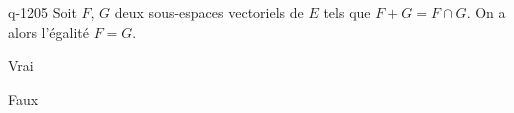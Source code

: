 \begin{truefalse}{q-1205}
Soit $F$, $G$ deux sous-espaces vectoriels de $E$ tels que $F+G=F\cap G$. On a alors l'égalité $F=G$.
\item* Vrai
\item Faux
\end{truefalse}

